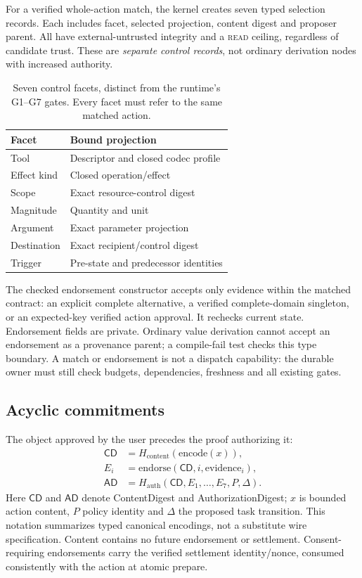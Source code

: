 \documentclass[letterpaper,twocolumn,10pt]{article}
\newcommand{\READ}{\textsc{read}}
\newcommand{\CD}{\ensuremath{\mathsf{CD}}}
\newcommand{\AD}{\ensuremath{\mathsf{AD}}}
\begin{document}
For a verified whole-action match, the kernel creates seven typed selection
records. Each includes facet, selected projection, content digest and proposer
parent. All have external-untrusted integrity and a \READ{} ceiling, regardless
of candidate trust. These are \emph{separate control records}, not ordinary
derivation nodes with increased authority.

\begin{table}[t]
\centering
\caption{Seven control facets, distinct from the runtime's G1--G7 gates.
Every facet must refer to the same matched action.}
\label{tab:facets}
\begin{tabularx}{\columnwidth}{@{}lY@{}}
\toprule
Facet & Bound projection \\
\midrule
Tool & Descriptor and closed codec profile \\
Effect kind & Closed operation/effect \\
Scope & Exact resource-control digest \\
Magnitude & Quantity and unit \\
Argument & Exact parameter projection \\
Destination & Exact recipient/control digest \\
Trigger & Pre-state and predecessor identities \\
\bottomrule
\end{tabularx}
\end{table}

The checked endorsement constructor accepts only evidence within the matched
contract: an explicit complete alternative, a verified complete-domain singleton,
or an expected-key verified action approval. It rechecks current state.
Endorsement fields are private. Ordinary value derivation cannot accept an
endorsement as a provenance parent; a compile-fail test checks this type boundary.
A match or endorsement is not a dispatch capability: the durable owner must
still check budgets, dependencies, freshness and all existing gates.

\subsection{Acyclic commitments}

The object approved by the user precedes the proof authorizing it:
\begin{align*}
  \CD &= H_{\mathrm{content}}(\mathrm{encode}(x)),\\
  E_i &= \mathrm{endorse}(\CD,i,\mathrm{evidence}_i),\\
  \AD &= H_{\mathrm{auth}}(\CD,E_1,\ldots,E_7,P,\Delta).
\end{align*}
Here \CD{} and \AD{} denote ContentDigest and AuthorizationDigest;
$x$ is bounded action content, $P$ policy identity and $\Delta$ the proposed
task transition. This notation summarizes typed canonical encodings, not a
substitute wire specification. Content contains no future endorsement or
settlement. Consent-requiring endorsements carry the verified settlement
identity/nonce, consumed consistently with the action at atomic prepare.
\end{document}
